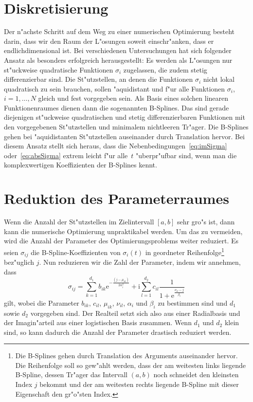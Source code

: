 \documentclass[a4paper]{scrartcl}
\newcommand{\ee}{{\mathrm{e}}}
\newcommand{\ii}{{\mathrm{i}}}
\begin{document}
\section{Diskretisierung}

Der n"achste Schritt auf dem Weg zu einer numerischen Optimierung besteht darin, dass wir den Raum der L"osungen soweit einschr"anken, dass er endlichdimensional ist. 
Bei verschiedenen Untersuchungen hat sich folgender Ansatz als besonders erfolgreich herausgestellt: 
Es werden als L"osungen nur st"uckweise quadratische Funktionen $\sigma_i$ zugelassen, die zudem stetig differenzierbar sind. 
Die St"utzstellen, an denen die Funktionen $\sigma_i$ nicht lokal quadratisch zu sein brauchen, sollen "aquidistant und f"ur alle Funktionen $\sigma_i$, $i=1,\ldots,N$ gleich und fest vorgegeben sein. 
Als Basis eines solchen linearen Funktionenraumes dienen dann die sogenannten B-Splines. 
Das sind gerade diejenigen st"uckweise quadratischen und stetig differenzierbaren Funktionen mit den vorgegebenen St"utzstellen und minimalem nichtleeren Tr"ager. 
Die B-Splines gehen bei "aquidistanten St"utzstellen auseinander durch Translation hervor. 
Bei diesem Ansatz stellt sich heraus, dass die Nebenbedingungen~\eqref{eq:imSigma} oder~\eqref{eq:absSigma} extrem leicht f"ur alle~$t$ "uberpr"ufbar sind, wenn man die komplexwertigen Koeffizienten der B-Splines kennt. 


\section{Reduktion des Parameterraumes}

Wenn die Anzahl der St"utzstellen im Zielintervall $[a,b]$ sehr gro"s ist, dann kann die numerische Optimierung unpraktikabel werden. 
Um das zu vermeiden, wird die Anzahl der Parameter des Optimierungsproblems weiter reduziert. 
Es seien $\sigma_{ij}$ die B-Spline-Koeffizienten von $\sigma_i(t)$ in geordneter Reihenfolge\footnote{Die B-Splines gehen durch Translation des Arguments auseinander hervor. Die Reihenfolge soll so gew"ahlt werden, dass der am weitesten links liegende B-Spline, dessen Tr"ager das Intervall $(a,b)$ noch schneidet den kleinsten Index $j$ bekommt und der am weitesten rechts liegende B-Spline mit dieser Eigenschaft den gr"o"sten Index.} bez"uglich $j$. Nun reduzieren wir die Zahl der Parameter, indem wir annehmen, dass 
$$ \sigma_{ij} = \sum_{k=1}^{d_1}b_{ik}\ee^{-\frac{(j-\mu_{ik})}{2\alpha_i^2}} + \ii\sum_{l=1}^{d_2}c_{il}\frac{1}{1+\ee^\frac{\nu_{il}-j}{\beta_i}} $$
gilt, wobei die Parameter $b_{ik}$, $c_{il}$, $\mu_{ik}$, $\nu_{il}$, $\alpha_i$ und $\beta_i$ zu bestimmen sind und $d_1$ sowie $d_2$ vorgegeben sind. 
Der Realteil setzt sich also aus einer Radialbasis und der Imagin"arteil aus einer logistischen Basis zusammen. 
Wenn $d_1$ und $d_2$ klein sind, so kann dadurch die Anzahl der Parameter drastisch reduziert werden. 
\end{document}
